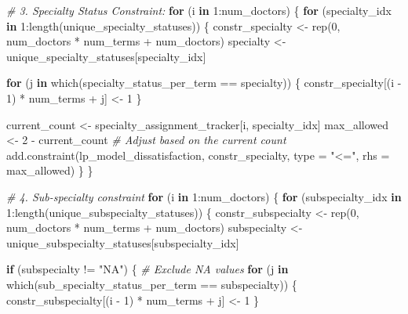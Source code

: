 \documentclass[
]{article}
\newenvironment{Shaded}{\begin{snugshade}}{\end{snugshade}}
\newcommand{\AttributeTok}[1]{\textcolor[rgb]{0.77,0.63,0.00}{#1}}
\newcommand{\CommentTok}[1]{\textcolor[rgb]{0.56,0.35,0.01}{\textit{#1}}}
\newcommand{\ControlFlowTok}[1]{\textcolor[rgb]{0.13,0.29,0.53}{\textbf{#1}}}
\newcommand{\DecValTok}[1]{\textcolor[rgb]{0.00,0.00,0.81}{#1}}
\newcommand{\FunctionTok}[1]{\textcolor[rgb]{0.00,0.00,0.00}{#1}}
\newcommand{\NormalTok}[1]{#1}
\newcommand{\OtherTok}[1]{\textcolor[rgb]{0.56,0.35,0.01}{#1}}
\newcommand{\SpecialCharTok}[1]{\textcolor[rgb]{0.00,0.00,0.00}{#1}}
\newcommand{\StringTok}[1]{\textcolor[rgb]{0.31,0.60,0.02}{#1}}
\begin{document}
\begin{Shaded}
\begin{Highlighting}[]
\CommentTok{\# 3. Specialty Status Constraint:}
\ControlFlowTok{for}\NormalTok{ (i }\ControlFlowTok{in} \DecValTok{1}\SpecialCharTok{:}\NormalTok{num\_doctors) \{}
  \ControlFlowTok{for}\NormalTok{ (specialty\_idx }\ControlFlowTok{in} \DecValTok{1}\SpecialCharTok{:}\FunctionTok{length}\NormalTok{(unique\_specialty\_statuses)) \{}
\NormalTok{    constr\_specialty }\OtherTok{\textless{}{-}} \FunctionTok{rep}\NormalTok{(}\DecValTok{0}\NormalTok{, num\_doctors }\SpecialCharTok{*}\NormalTok{ num\_terms }\SpecialCharTok{+}\NormalTok{ num\_doctors)}
\NormalTok{    specialty }\OtherTok{\textless{}{-}}\NormalTok{ unique\_specialty\_statuses[specialty\_idx]}
    
    \ControlFlowTok{for}\NormalTok{ (j }\ControlFlowTok{in} \FunctionTok{which}\NormalTok{(specialty\_status\_per\_term }\SpecialCharTok{==}\NormalTok{ specialty)) \{}
\NormalTok{      constr\_specialty[(i }\SpecialCharTok{{-}} \DecValTok{1}\NormalTok{) }\SpecialCharTok{*}\NormalTok{ num\_terms }\SpecialCharTok{+}\NormalTok{ j] }\OtherTok{\textless{}{-}} \DecValTok{1}
\NormalTok{    \}}
    
\NormalTok{    current\_count }\OtherTok{\textless{}{-}}\NormalTok{ specialty\_assignment\_tracker[i, specialty\_idx]}
\NormalTok{    max\_allowed }\OtherTok{\textless{}{-}} \DecValTok{2} \SpecialCharTok{{-}}\NormalTok{ current\_count  }\CommentTok{\# Adjust based on the current count}
    \FunctionTok{add.constraint}\NormalTok{(lp\_model\_dissatisfaction, constr\_specialty, }\AttributeTok{type =} \StringTok{"\textless{}="}\NormalTok{, }\AttributeTok{rhs =}\NormalTok{ max\_allowed)}
\NormalTok{  \}}
\NormalTok{\}}

\CommentTok{\# 4. Sub{-}specialty constraint}
    \ControlFlowTok{for}\NormalTok{ (i }\ControlFlowTok{in} \DecValTok{1}\SpecialCharTok{:}\NormalTok{num\_doctors) \{}
  \ControlFlowTok{for}\NormalTok{ (subspecialty\_idx }\ControlFlowTok{in} \DecValTok{1}\SpecialCharTok{:}\FunctionTok{length}\NormalTok{(unique\_subspecialty\_statuses)) \{}
\NormalTok{    constr\_subspecialty }\OtherTok{\textless{}{-}} \FunctionTok{rep}\NormalTok{(}\DecValTok{0}\NormalTok{, num\_doctors }\SpecialCharTok{*}\NormalTok{ num\_terms }\SpecialCharTok{+}\NormalTok{ num\_doctors)}
\NormalTok{    subspecialty }\OtherTok{\textless{}{-}}\NormalTok{ unique\_subspecialty\_statuses[subspecialty\_idx]}

    \ControlFlowTok{if}\NormalTok{ (subspecialty }\SpecialCharTok{!=} \StringTok{"NA"}\NormalTok{) \{  }\CommentTok{\# Exclude NA values}
      \ControlFlowTok{for}\NormalTok{ (j }\ControlFlowTok{in} \FunctionTok{which}\NormalTok{(sub\_specialty\_status\_per\_term }\SpecialCharTok{==}\NormalTok{ subspecialty)) \{}
\NormalTok{        constr\_subspecialty[(i }\SpecialCharTok{{-}} \DecValTok{1}\NormalTok{) }\SpecialCharTok{*}\NormalTok{ num\_terms }\SpecialCharTok{+}\NormalTok{ j] }\OtherTok{\textless{}{-}} \DecValTok{1}
\NormalTok{      \}}


\end{Highlighting}
\end{Shaded}
\end{document}
